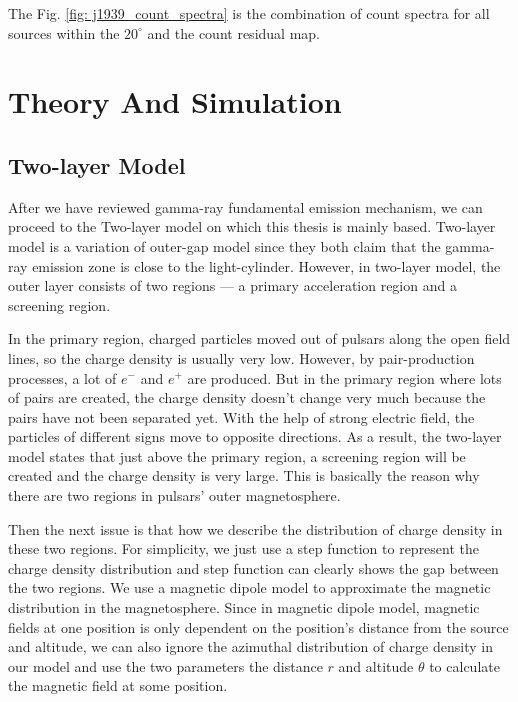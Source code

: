 \documentclass[12pt]{report}
\begin{document}
          The Fig. \ref{fig: j1939_count_spectra} is the combination of count spectra for 
          all sources within the $20^{\circ}$ and the count residual map. 

          
          
        \vspace{1cm}

    \chapter{Theory And Simulation}
      \section{Two-layer Model}
        After we have reviewed gamma-ray fundamental emission mechanism, we can proceed to
        the Two-layer model on which this thesis is mainly based. Two-layer model is a 
        variation of outer-gap model since they both claim that the gamma-ray emission zone
        is close to the light-cylinder. However, in two-layer model, the outer layer 
        consists of two regions --- a primary acceleration region and a screening region. 

        In the primary region, charged particles moved out of pulsars along the open field 
        lines, 
        so the charge density is usually very low. 
        However, by pair-production processes, a lot of $e^{-}$ and $e^{+}$ are produced. 
        But in the primary region where lots of pairs are created, the charge density 
        doesn't 
        change very much because the pairs have not been separated yet. With the help of 
        strong 
        electric field, the particles of different signs move to opposite directions. 
        As a result, the two-layer model states that just above the primary region, a 
        screening 
        region will be created and the charge density is very large. This is basically the reason why 
        there are two regions in pulsars' outer magnetosphere.

        Then the next issue is that how we describe the distribution of charge density in these two regions. 
        For simplicity, we just use a step function to represent the charge density distribution and step function 
        can clearly shows the gap between the two regions. We use a magnetic dipole model to approximate the 
        magnetic distribution in the magnetosphere. Since in magnetic dipole model, magnetic fields at one 
        position is only dependent on the position's distance from the source and altitude, we can 
        also ignore the azimuthal distribution of charge density in our model and use the two parameters
        the distance $r$ and altitude $\theta$ to calculate the magnetic field at some position.
\end{document}
